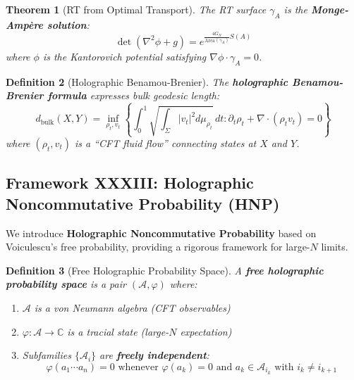 \documentclass[12pt,a4paper]{article}
\newtheorem{theorem}{Theorem}[section]
\newtheorem{definition}[theorem]{Definition}
\begin{document}
\begin{theorem}[RT from Optimal Transport]\label{thm:rt-optimal-transport}
The RT surface $\gamma_A$ is the \textbf{Monge-Amp\`ere solution}:
\begin{equation}
\det\left(\nabla^2 \phi + g\right) = e^{\frac{4G_N}{\text{Area}(\gamma_A)} S(A)}
\end{equation}
where $\phi$ is the Kantorovich potential satisfying $\nabla \phi \cdot \gamma_A = 0$.
\end{theorem}

\begin{definition}[Holographic Benamou-Brenier]\label{def:holo-bb}
The \textbf{holographic Benamou-Brenier formula} expresses bulk geodesic length:
\begin{equation}
d_{\text{bulk}}(X, Y) = \inf_{\rho_t, v_t} \left\{ \int_0^1 \sqrt{\int_\Sigma |v_t|^2 d\mu_{\rho_t}} \, dt : \partial_t \rho_t + \nabla \cdot (\rho_t v_t) = 0 \right\}
\end{equation}
where $(\rho_t, v_t)$ is a ``CFT fluid flow'' connecting states at $X$ and $Y$.
\end{definition}

\subsection{Framework XXXIII: Holographic Noncommutative Probability (HNP)}
\label{subsec:holographic-nc-probability}

We introduce \textbf{Holographic Noncommutative Probability} based on Voiculescu's free probability, providing a rigorous framework for large-$N$ limits.

\begin{definition}[Free Holographic Probability Space]\label{def:free-holo}
A \textbf{free holographic probability space} is a pair $(\mathcal{A}, \varphi)$ where:
\begin{enumerate}
    \item $\mathcal{A}$ is a von Neumann algebra (CFT observables)
    \item $\varphi: \mathcal{A} \to \mathbb{C}$ is a tracial state (large-$N$ expectation)
    \item Subfamilies $\{\mathcal{A}_i\}$ are \textbf{freely independent}:
    \begin{equation}
    \varphi(a_1 \cdots a_n) = 0 \text{ whenever } \varphi(a_k) = 0 \text{ and } a_k \in \mathcal{A}_{i_k} \text{ with } i_k \neq i_{k+1}
    \end{equation}
\end{enumerate}
\end{definition}
\end{document}
